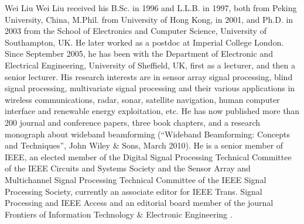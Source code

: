 \documentclass[10pt,final]{IEEEtran}
\begin{document}
\begin{IEEEbiography}
{Wei Liu} Wei Liu received his B.Sc. in 1996 and L.L.B. in 1997, both from Peking University, China, M.Phil. from University of Hong Kong, in 2001, and Ph.D. in 2003 from the School of Electronics and Computer Science, University of Southampton, UK. He later worked as a postdoc at Imperial College London. Since September 2005, he has been with the Department of Electronic and Electrical Engineering, University of Sheffield, UK, first as a lecturer, and then a senior lecturer. His research interests are in sensor array signal processing, blind signal processing, multivariate signal processing and their various applications in wireless communications, radar, sonar, satellite navigation, human computer interface and renewable energy exploitation, etc. He has now published more than 200 journal and conference papers, three book chapters, and a research monograph about wideband beamforming (``Wideband Beamforming: Concepts and Techniques'', John Wiley $\&$ Sons, March 2010). He is a senior member of IEEE, an elected member of the Digital Signal Processing Technical Committee of the IEEE Circuits and Systems Society and the Sensor Array and Multichannel Signal Processing Technical Committee of the IEEE Signal Processing Society, currently an associate editor for IEEE Trans. Signal Processing and IEEE Access and an editorial board member of the journal Frontiers of Information Technology $\&$ Electronic Engineering .
\end{IEEEbiography}



\end{document}
